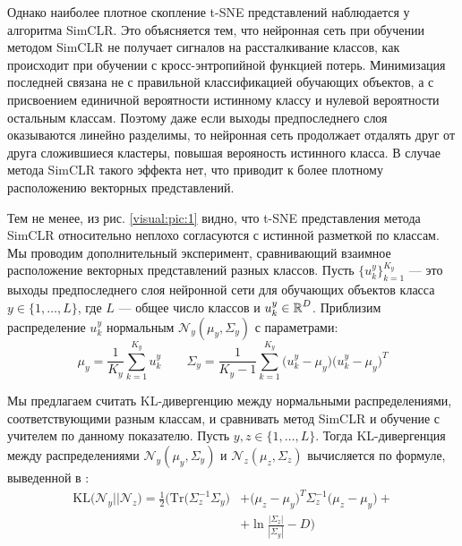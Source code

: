 Однако наиболее плотное скопление t-SNE представлений наблюдается у алгоритма SimCLR. Это объясняется тем, что нейронная сеть при обучении методом SimCLR не получает сигналов на рассталкивание классов, как происходит при обучении с кросс-энтропийной функцией потерь. Минимизация последней связана не с правильной классификацией обучающих объектов, а с присвоением единичной вероятности истинному классу и нулевой вероятности остальным классам. Поэтому даже если выходы предпоследнего слоя оказываются линейно разделимы, то нейронная сеть продолжает отдалять друг от друга сложившиеся кластеры, повышая верояность истинного класса. В случае метода SimCLR такого эффекта нет, что приводит к более плотному расположению векторных представлений.

Тем не менее, из рис. \ref{visual:pic:1} видно, что t-SNE представления метода SimCLR относительно неплохо согласуются с истинной разметкой по классам. Мы проводим дополнительный эксперимент, сравнивающий взаимное расположение векторных представлений разных классов. Пусть $\{u_k^y\}_{k=1}^{K_y}$ --- это выходы предпоследнего слоя нейронной сети для обучающих объектов класса $y \in \{1, \dots, L\}$, где $L$ --- общее число классов и $u_k^y \in \operatorname{\mathbb{R}}^D$. Приблизим распределение $u_k^y$ нормальным $\mathcal{N}_y(\mu_y, \Sigma_y)$ с параметрами:
\begin{equation}
    \mu_y = \frac{1}{K_y} \sum_{k=1}^{K_y} u_k^y \quad\quad \Sigma_y = \frac{1}{K_y - 1} \sum_{k=1}^{K_y} \big(u_k^y - \mu_y\big) \big(u_k^y - \mu_y\big)^T
\end{equation}

\noindent
Мы предлагаем считать KL-дивергенцию между нормальными распределениями, соответствующими разным классам, и сравнивать метод SimCLR и обучение с учителем по данному показателю. Пусть $y, z \in \{1, \dots, L\}$. Тогда KL-дивергенция между распределениями $\mathcal{N}_y(\mu_y, \Sigma_y)$ и $\mathcal{N}_z(\mu_z, \Sigma_z)$ вычисляется по формуле, выведенной в \cite{kl}:
\begin{equation}
\begin{aligned}
    \text{KL}\big(\mathcal{N}_y \big|\big| \mathcal{N}_z\big) = \frac{1}{2} \bigg(\text{Tr}\big(\Sigma_z^{-1} \Sigma_y\big) &+ \big(\mu_z - \mu_y\big)^T \Sigma_z^{-1} \big(\mu_z - \mu_y\big) + \\
    &+ \ln \frac{|\Sigma_z|}{|\Sigma_y|} - D\bigg)
\end{aligned}
\end{equation}

